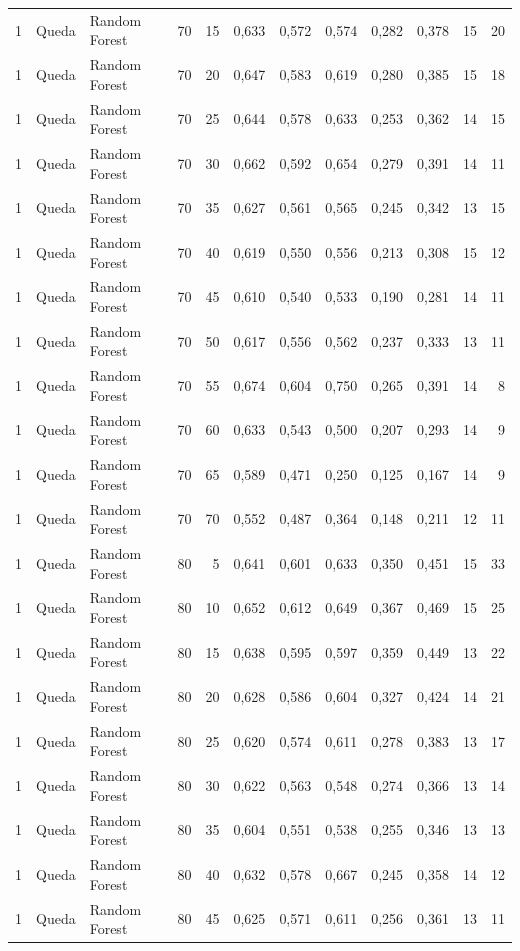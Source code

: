 \begin{longtable}{@{}rllrrrrrrrrr@{}}
1 & Queda & Random Forest & 70 & 15 & 0,633 & 0,572 & 0,574 & 0,282 & 0,378 & 15 & 20 \\
1 & Queda & Random Forest & 70 & 20 & 0,647 & 0,583 & 0,619 & 0,280 & 0,385 & 15 & 18 \\
1 & Queda & Random Forest & 70 & 25 & 0,644 & 0,578 & 0,633 & 0,253 & 0,362 & 14 & 15 \\
1 & Queda & Random Forest & 70 & 30 & 0,662 & 0,592 & 0,654 & 0,279 & 0,391 & 14 & 11 \\
1 & Queda & Random Forest & 70 & 35 & 0,627 & 0,561 & 0,565 & 0,245 & 0,342 & 13 & 15 \\
1 & Queda & Random Forest & 70 & 40 & 0,619 & 0,550 & 0,556 & 0,213 & 0,308 & 15 & 12 \\
1 & Queda & Random Forest & 70 & 45 & 0,610 & 0,540 & 0,533 & 0,190 & 0,281 & 14 & 11 \\
1 & Queda & Random Forest & 70 & 50 & 0,617 & 0,556 & 0,562 & 0,237 & 0,333 & 13 & 11 \\
1 & Queda & Random Forest & 70 & 55 & 0,674 & 0,604 & 0,750 & 0,265 & 0,391 & 14 & 8 \\
1 & Queda & Random Forest & 70 & 60 & 0,633 & 0,543 & 0,500 & 0,207 & 0,293 & 14 & 9 \\
1 & Queda & Random Forest & 70 & 65 & 0,589 & 0,471 & 0,250 & 0,125 & 0,167 & 14 & 9 \\
1 & Queda & Random Forest & 70 & 70 & 0,552 & 0,487 & 0,364 & 0,148 & 0,211 & 12 & 11 \\
1 & Queda & Random Forest & 80 & 5 & 0,641 & 0,601 & 0,633 & 0,350 & 0,451 & 15 & 33 \\
1 & Queda & Random Forest & 80 & 10 & 0,652 & 0,612 & 0,649 & 0,367 & 0,469 & 15 & 25 \\
1 & Queda & Random Forest & 80 & 15 & 0,638 & 0,595 & 0,597 & 0,359 & 0,449 & 13 & 22 \\
1 & Queda & Random Forest & 80 & 20 & 0,628 & 0,586 & 0,604 & 0,327 & 0,424 & 14 & 21 \\
1 & Queda & Random Forest & 80 & 25 & 0,620 & 0,574 & 0,611 & 0,278 & 0,383 & 13 & 17 \\
1 & Queda & Random Forest & 80 & 30 & 0,622 & 0,563 & 0,548 & 0,274 & 0,366 & 13 & 14 \\
1 & Queda & Random Forest & 80 & 35 & 0,604 & 0,551 & 0,538 & 0,255 & 0,346 & 13 & 13 \\
1 & Queda & Random Forest & 80 & 40 & 0,632 & 0,578 & 0,667 & 0,245 & 0,358 & 14 & 12 \\
1 & Queda & Random Forest & 80 & 45 & 0,625 & 0,571 & 0,611 & 0,256 & 0,361 & 13 & 11 \\

\end{longtable}
